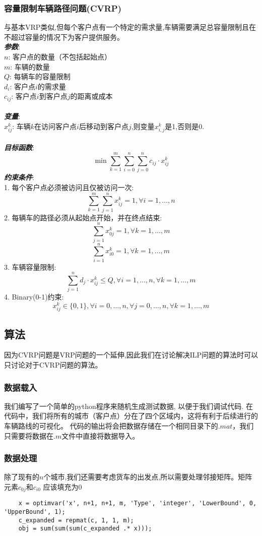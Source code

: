 \subsubsection{容量限制车辆路径问题(CVRP)}
与基本VRP类似,但每个客户点有一个特定的需求量,车辆需要满足总容量限制且在不超过容量的情况下为客户提供服务。
    \\
    \textbf{\textit{参数}}:\\
    $n$: 客户点的数量（不包括起始点）\\
    $m$: 车辆的数量\\
    $Q$: 每辆车的容量限制\\
    $d_i$: 客户点$i$的需求量\\
    $c_{ij}$: 客户点$i$到客户点$j$的距离或成本\\
    \\
    \textbf{\textit{变量}}:\\
    $x_{ij}^{k}$: 车辆$k$在访问客户点$i$后移动到客户点$j$,则变量$x_{i,j}^k$是1,否则是0.\\
    \\
    \textbf{\textit{目标函数}}:
    \[\min\sum_{k=1}^{m}\sum_{i=0}^{n}\sum_{j=0}^{n}c_{ij}\cdot x_{ij}^{k}\]
    \textbf{\textit{约束条件}}:\\
    1. 每个客户点必须被访问且仅被访问一次:
    \[\sum_{k=1}^{m}\sum_{j=1}^{n}x_{ij}^{k} = 1, \forall i = 1, \dots, n\]
    2. 每辆车的路径必须从起始点开始，并在终点结束:
    \[\sum_{j = 1}^{n}x_{0j}^{k} = 1, \forall k = 1, \dots, m\]
    \[\sum_{i = 1}^{n}x_{i0}^{k} = 1, \forall k = 1, \dots, m\]
    3. 车辆容量限制:
    \[\sum_{j = 1}^{n}d_{j}\cdot x_{ij}^{k} \leq Q, \forall i = 1, \dots, n, \forall k = 1, \dots, m\]
    4. Binary(0-1)约束:
    \[x_{ij}^{k}\in \{0, 1\}, \forall i = 0, \dots, n, \forall j = 0, \dots, n, \forall k = 1, \dots, m\]

\subsection{算法}
    因为CVRP问题是VRP问题的一个延伸,因此我们在讨论解决ILP问题的算法时可以只讨论对于CVRP问题的算法。
\subsubsection{数据载入}
    我们编写了一个简单的python程序来随机生成测试数据, 以便于我们调试代码. 在代码中，我们将所有的城市（客户点）分在了四个区域内，这将有利于后续进行的车辆路线的可视化。
    代码的输出将会把数据存储在一个相同目录下的$.mat$，我们只需要将数据在$.m$文件中直接将数据导入。
\subsubsection{数据处理}
除了现有的$n$个城市,我们还需要考虑货车的出发点,所以需要处理邻接矩阵。矩阵元素$c_{0j}$和$c_{i0}$ 应该填充为0
    \begin{lstlisting}
    x = optimvar('x', n+1, n+1, m, 'Type', 'integer', 'LowerBound', 0, 'UpperBound', 1);
    c_expanded = repmat(c, 1, 1, m);
    obj = sum(sum(sum(c_expanded .* x)));
    \end{lstlisting}
